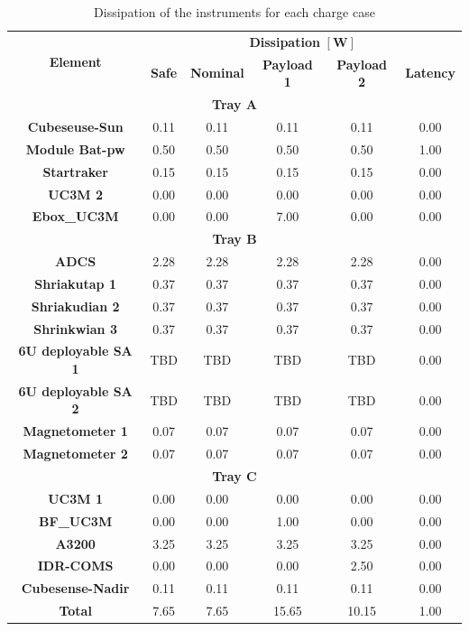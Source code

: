 \begin{table}[H]
    \centering
    \caption{Dissipation of the instruments for each charge case}
    \label{tab:dissipationUPMSat3}
    
\begin{tabular}{cccccc}
    \toprule \multirow{2}{*}{ \textbf{Element }} & \multicolumn{5}{c}{ \textbf{Dissipation} $[\mathbf{W}]$} \\
    \cline{2-6} & \textbf{Safe} & \textbf{Nominal} & \textbf{Payload 1} & \textbf{Payload 2} &\textbf{ Latency} \\
    \hline \multicolumn{6}{c}{ \textbf{Tray A }} \\
    \hline \textbf{Cubeseuse-Sun} & 0.11 & 0.11 & 0.11 & 0.11 & 0.00 \\
     \textbf{Module Bat-pw} & 0.50 & 0.50 & 0.50 & 0.50 & 1.00 \\
     \textbf{Startraker} & 0.15 & 0.15 & 0.15 & 0.15 & 0.00 \\
     \textbf{UC3M 2} & 0.00 & 0.00 & 0.00 & 0.00 & 0.00 \\
     \textbf{Ebox\_UC3M} & 0.00 & 0.00 & 7.00 & 0.00 & 0.00 \\
    \hline \multicolumn{6}{c}{ \textbf{Tray B }} \\
    \hline \textbf{ADCS} & 2.28 & 2.28 & 2.28 & 2.28 & 0.00 \\
     \textbf{Shriakutap 1} & 0.37 & 0.37 & 0.37 & 0.37 & 0.00 \\
     \textbf{Shriakudian 2} & 0.37 & 0.37 & 0.37 & 0.37 & 0.00 \\
     \textbf{Shrinkwian 3} & 0.37 & 0.37 & 0.37 & 0.37 & 0.00 \\
     \textbf{6U deployable SA 1} & TBD & TBD & TBD & TBD & 0.00 \\
     \textbf{6U deployable SA 2} & TBD & TBD & TBD & TBD & 0.00 \\
     \textbf{Magnetometer 1} & 0.07 & 0.07 & 0.07 & 0.07 & 0.00 \\
     \textbf{Magnetometer 2} & 0.07 & 0.07 & 0.07 & 0.07 & 0.00 \\
    \hline \multicolumn{6}{c}{ \textbf{Tray C} } \\
    \hline \textbf{UC3M 1} & 0.00 & 0.00 & 0.00 & 0.00 & 0.00 \\
     \textbf{BF\_UC3M} & 0.00 & 0.00 & 1.00 & 0.00 & 0.00 \\
    \textbf{ A3200 }& 3.25 & 3.25 & 3.25 & 3.25 & 0.00 \\
      \textbf{IDR-COMS} & 0.00 & 0.00 & 0.00 & 2.50 & 0.00 \\
    \textbf{ Cubesense-Nadir} & 0.11 & 0.11 & 0.11 & 0.11 & 0.00 \\
     \hline \textbf{Total} & 7.65 & 7.65 & 15.65 & 10.15 & 1.00 \\
     \bottomrule
    
    \end{tabular}
    \end{table}

